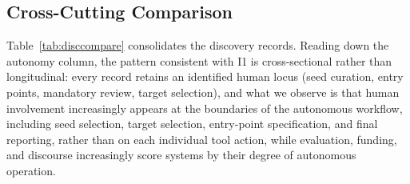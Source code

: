 \documentclass[conference,compsoc]{IEEEtran}
\begin{document}
\subsection{Cross-Cutting Comparison}
Table~\ref{tab:disccompare} consolidates the discovery records. Reading down the autonomy
column, the pattern consistent with I1 is cross-sectional rather than longitudinal: every record retains an
identified human locus (seed curation, entry points, mandatory review, target selection), and what
we observe is that human involvement increasingly appears at the boundaries of the autonomous
workflow, including seed selection, target selection, entry-point specification, and final reporting, rather
than on each individual tool action, while evaluation, funding, and discourse increasingly score
systems by their degree of autonomous operation.

\begin{table}[t]
\centering\scriptsize
\caption{Discovery-side comparison across autonomy levels. E-class per protocol v4;
validity flags use the V1--V5 taxonomy of Sec.~\ref{sec:validity}. Operational statistics are
source-reported; their provenance varies across vendor disclosures, research reports, and
controlled experiments.}
\label{tab:disccompare}
\end{table}

\vspace{6pt}
\end{document}

